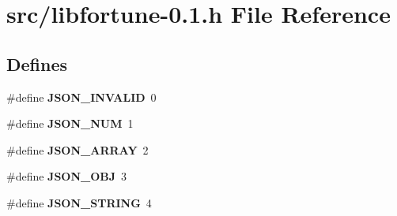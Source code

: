 \hypertarget{libfortune-0_81_8h}{\section{src/libfortune-\/0.1.h \-File \-Reference}
\label{libfortune-0_81_8h}
}
\subsection*{\-Defines}
\begin{DoxyCompactItemize}
\item 
\hypertarget{libfortune-0_81_8h_a214614eae32045fa6185a23e5bd356bb}{\#define {\bfseries \-J\-S\-O\-N\-\_\-\-I\-N\-V\-A\-L\-I\-D}~0}\label{libfortune-0_81_8h_a214614eae32045fa6185a23e5bd356bb}

\item 
\hypertarget{libfortune-0_81_8h_acf39f5fc5259f83069591f02e88e864c}{\#define {\bfseries \-J\-S\-O\-N\-\_\-\-N\-U\-M}~1}\label{libfortune-0_81_8h_acf39f5fc5259f83069591f02e88e864c}

\item 
\hypertarget{libfortune-0_81_8h_a783fbe49e14e77948af141c0581391f6}{\#define {\bfseries \-J\-S\-O\-N\-\_\-\-A\-R\-R\-A\-Y}~2}\label{libfortune-0_81_8h_a783fbe49e14e77948af141c0581391f6}

\item 
\hypertarget{libfortune-0_81_8h_a32c709734c5faa4062b69114bcaa6159}{\#define {\bfseries \-J\-S\-O\-N\-\_\-\-O\-B\-J}~3}\label{libfortune-0_81_8h_a32c709734c5faa4062b69114bcaa6159}

\item 
\hypertarget{libfortune-0_81_8h_adea584ac98210649e2edf68941091356}{\#define {\bfseries \-J\-S\-O\-N\-\_\-\-S\-T\-R\-I\-N\-G}~4}\label{libfortune-0_81_8h_adea584ac98210649e2edf68941091356}

\end{DoxyCompactItemize}
